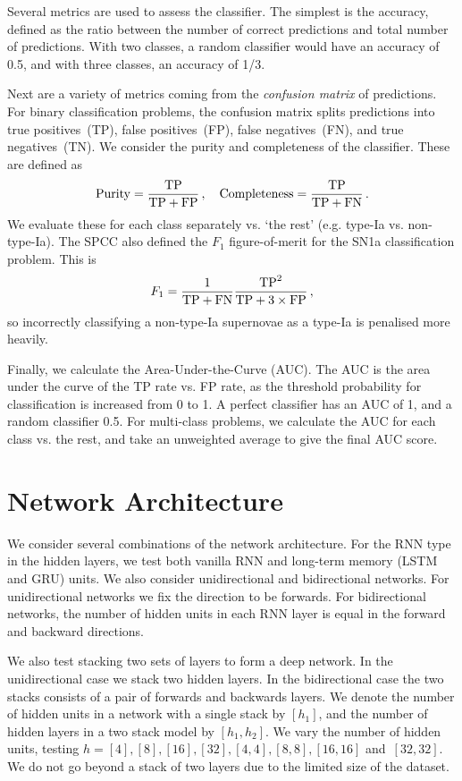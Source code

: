 \documentclass[twocolumn]{aastex61}
\begin{document}
Several metrics are used to assess the classifier. The simplest is the accuracy, defined as the ratio between the number of correct predictions and total number of predictions. With two classes, a random classifier would have an accuracy of 0.5, and with three classes, an accuracy of 1/3.

Next are a variety of metrics coming from the {\em confusion matrix} of predictions.  For binary classification problems, the confusion matrix splits predictions into true positives~(TP), false positives~(FP), false negatives~(FN), and true negatives~(TN). We consider the purity and completeness of the classifier. These are defined as 
\begin{equation}
{\rm Purity} = \frac{{\rm TP}}{{\rm TP}+{\rm FP}}\,, \quad {\rm Completeness} = \frac{{\rm TP}}{{\rm TP}+{\rm FN}}\,.
\end{equation}
We evaluate these for each class separately vs. `the rest' (e.g. type-Ia vs. non-type-Ia). The SPCC also defined the $F_1$ figure-of-merit for the SN1a classification problem. This is 
\begin{equation}
F_1 = \frac{1}{{\rm TP}+{\rm FN}} \frac{{\rm TP}^2}{{\rm TP}+3 \times {\rm FP}}\,,
\end{equation}
so incorrectly classifying a non-type-Ia supernovae as a type-Ia is penalised more heavily.

Finally, we calculate the Area-Under-the-Curve (AUC). The AUC is the area under the curve of the TP rate vs. FP rate, as the threshold probability for classification is increased from 0 to 1. A perfect classifier has an AUC of 1, and a random classifier 0.5. For multi-class problems, we calculate the AUC for each class vs. the rest, and take an unweighted average to give the final AUC score. 

\section{Network Architecture}

We consider several combinations of the network architecture. For the RNN type in the hidden layers, we test both vanilla RNN and long-term memory (LSTM and GRU) units. We also consider unidirectional and bidirectional networks. For unidirectional networks we fix the direction to be forwards. For bidirectional networks, the number of hidden units in each RNN layer is equal in the forward and backward directions. 

We also test stacking two sets of layers to form a deep network.  In the unidirectional case we stack two hidden layers. In the bidirectional case the two stacks consists  of a pair  of forwards and backwards layers.  We denote the number of hidden units in a network with a  single stack by $[h_1]$, and the number of hidden layers in a two stack model by $[h_1, h_2]$. We vary the number of hidden units, testing $h=[4],[8],[16],[32],[4,4],[8,8],[16,16]$ and~$[32,32]$. We do not go beyond a stack of two layers due to the limited size of the dataset. 
\end{document}
